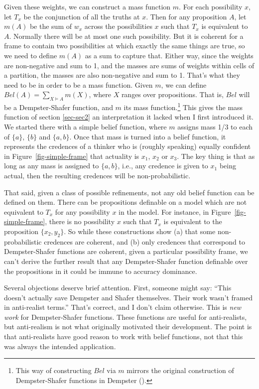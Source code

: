 \documentclass[
  11pt,
  letterpaper,
  DIV=11,
  numbers=noendperiod,
  twoside]{scrartcl}
\begin{document}
Given these weights, we can construct a mass function \(m\). For each
possibility \(x\), let \(T_x\) be the conjunction of all the truths at
\(x\). Then for any proposition \(A\), let \(m(A)\) be the sum of
\(w_x\) across the possibilities \(x\) such that \(T_x\) is equivalent
to \(A\). Normally there will be at most one such possibility. But it is
coherent for a frame to contain two possibilities at which exactly the
same things are true, so we need to define \(m(A)\) as a sum to capture
that. Either way, since the weights are non-negative and sum to 1, and
the masses are sums of weights within cells of a partition, the masses
are also non-negative and sum to 1. That's what they need to be in order
to be a mass function. Given \(m\), we can define
\(Bel(A) = \sum_{X \vDash A} m(X)\), where \(X\) ranges over
propositions. That is, \(Bel\) will be a Dempster-Shafer function, and
\(m\) its mass function.\footnote{This way of constructing \(Bel\) via
  \(m\) mirrors the original construction of Dempster-Shafer functions
  in Dempster ().} This gives the mass
function of section \ref{sec-sec2} an interpretation it lacked when I
first introduced it. We started there with a simple belief function,
where \(m\) assigns mass 1/3 to each of \(\{a\}\), \(\{b\}\) and
\(\{a, b\}\). Once that mass is turned into a belief function, it
represents the credences of a thinker who is (roughly speaking) equally
confident in Figure~\ref{fig-simple-frame} that actuality is \(x_1\),
\(x_2\) or \(x_3\). The key thing is that as long as any mass is
assigned to \(\{a, b\}\), i.e., any credence is given to \(x_1\) being
actual, then the resulting credences will be non-probabilistic.

That said, given a class of possible refinements, not any old belief
function can be defined on them. There can be propositions definable on
a model which are not equivalent to \(T_x\) for any possibility \(x\) in
the model. For instance, in Figure~\ref{fig-simple-frame}, there is no
possibility \(x\) such that \(T_x\) is equivalent to the proposition
\(\{x_2, y_2\}\). So while these constructions show (a) that some
non-probabilistic credences are coherent, and (b) only credences that
correspond to Dempster-Shafer functions are coherent, given a particular
possibility frame, we can't derive the further result that any
Dempster-Shafer function definable over the propositions in it could be
immune to accuracy dominance.

Several objections deserve brief attention. First, someone might say:
``This doesn't actually save Dempster and Shafer themselves. Their work
wasn't framed in anti-realist terms.'' That's correct, and I don't claim
otherwise. This is \emph{new work} for Dempster-Shafer functions. These
functions are useful for anti-realists, but anti-realism is not what
originally motivated their development. The point is that anti-realists
have good reason to work with belief functions, not that this was always
the intended application.
\end{document}
